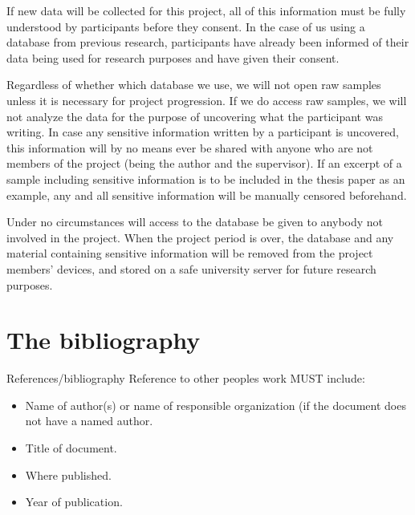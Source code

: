 \documentclass[informationsecurity]{gucmasterproject}
\begin{document}
If new data will be collected for this project, all of this information must be fully understood by participants before they consent.
In the case of us using a database from previous research, participants have already been informed of their data being used for research purposes and have given their consent.

Regardless of whether which database we use, we will not open raw samples unless it is necessary for project progression.
If we do access raw samples, we will not analyze the data for the purpose of uncovering what the participant was writing.
In case any sensitive information written by a participant is uncovered, this information will by no means ever be shared with anyone who are not members of the project (being the author and the supervisor).
If an excerpt of a sample including sensitive information is to be included in the thesis paper as an example, any and all sensitive information will be manually censored beforehand.

Under no circumstances will access to the database be given to anybody not involved in the project.
When the project period is over, the database and any material containing sensitive information will be removed from the project members' devices, and stored on a safe university server for future research purposes.


%


\chapter{The bibliography}
References/bibliography
Reference to other peoples work MUST include:
\begin{itemize}
\item Name of author(s)  or name of responsible organization (if the document does not have a named author.
\item Title of document.
\item Where published.
\item Year of publication.
\end{itemize}
\end{document}
